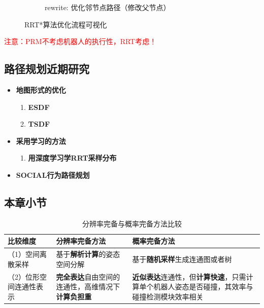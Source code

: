 \documentclass[../main.tex]{subfiles}
\begin{document}
\begin{enumerate}
\begin{figure}[H]
\begin{subfigure}[b]{0.19\textwidth}
                    \caption{rewrite: 优化邻节点路径（修改父节点）}
                    \label{fig:rrts5}
                \end{subfigure}
                \caption{RRT*算法优化流程可视化}
                \label{fig:rrts_process}
            \end{figure}
    \textcolor{red}{注意：PRM不考虑机器人的执行性，RRT考虑！}
    \end{enumerate}

\subsection{路径规划近期研究}\label{subsec:recent_research}
\begin{itemize}
    \item \textbf{地图形式的优化}\label{item:recent:map}
        \begin{enumerate}
            \item \textbf{ESDF}\label{item:recent:map:esdf}
            \item \textbf{TSDF}\label{item:recent:map:tsdf}
        \end{enumerate}
    \item \textbf{采用学习的方法}\label{item:recent:learning}
        \begin{enumerate}
            \item \textbf{用深度学习学RRT采样分布}\label{item:recent:learning:deep_rrt}
        \end{enumerate}
    \item \textbf{SOCIAL行为路径规划}\label{item:recent:social}
\end{itemize}

\subsection*{本章小节}
\begin{table}[H]
    \centering
    \small
    \begin{tabular}{p{4cm}p{5.5cm}p{5.5cm}}
        \toprule
        \textbf{比较维度} & \textbf{分辨率完备方法} & \textbf{概率完备方法} \\
        \midrule
        （1）空间离散采样 & 基于\textbf{解析计算}的姿态空间分解 & 基于\textbf{随机采样}生成连通图或者树 \\
        （2）位形空间连通性表示 & \textbf{完全表达}自由空间的连通性，高维情况下\textbf{计算负担重} & \textbf{近似表达}连通性，但\textbf{计算快速}，只需计算单个机器人姿态是否碰撞，其效率与碰撞检测模块效率相关 \\
        \bottomrule
    \end{tabular}
    \caption{分辨率完备与概率完备方法比较}
    \label{tab:resolution_vs_probabilistic}
\end{table}
\end{document}
